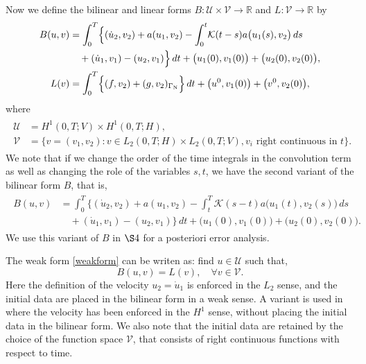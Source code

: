 \documentclass{amsart}
\numberwithin{equation}{section}
\theoremstyle{definition}
\begin{document}
Now we define the bilinear and linear forms
$B:{\mathcal U}\times {\mathcal V} \to \mathbb{R}$ and 
$L:{\mathcal V} \to \mathbb{R}$  
by
\begin{align}  \label{BL}
  \begin{aligned}
    B(u,v)
    &=\int_0^T\!
      \Big\{(\dot u_2,v_2)+a(u_1,v_2)
        -\int_0^t\!{\mathcal K}(t-s)a\big(u_1(s),v_2\big)\,ds\\
    &\quad +(\dot u_1,v_1)-(u_2,v_1)\Big\}\,dt
      +\big(u_1(0),v_1(0)\big)+\big(u_2(0),v_2(0)\big),\\
    L(v)&=\int_0^T\!\Big\{(f,v_2)+(g,v_2)_{\Gamma_{\text N}}\Big\}\,dt
      +\big(u^0,v_1(0)\big)+\big(v^0,v_2(0)\big),
  \end{aligned}
\end{align}
where
\begin{align}   \label{UV}
  \begin{aligned}
    {\mathcal U}&=H^1(0,T;V)\times H^1(0,T;H),\\
    {\mathcal V}&=\big\{v=(v_1,v_2):
      v\in L_2(0,T;H)\times L_2(0,T;V),
      v_i \text{ right continuous in }t \big\}.
  \end{aligned}
\end{align}
We note that if we change the order of the time integrals in the 
convolution term as well as changing the role of the variables $s,t$, 
we have the second variant of the bilinear form $B$, that is, 
\begin{align}  \label{B2}
  \begin{aligned}
    B(u,v)
    &=\int_0^T\!
      \Big\{(\dot u_2,v_2)+a(u_1,v_2)
        -\int_t^T\!{\mathcal K}(s-t) a\big(u_1(t),v_2(s)\big)\,ds \\
    &\quad +(\dot u_1,v_1)-(u_2,v_1) \Big\}\,dt
      +\big(u_1(0),v_1(0)\big)+\big(u_2(0),v_2(0)\big).
  \end{aligned}
\end{align}
We use this variant of $B$ in $\S4$ for a posteriori error analysis.

The weak form \eqref{weakform} can be writen as: 
find $u\in {\mathcal U}$ such that,
\begin{equation} \label{weakformprimary}
  B(u,v)=L(v),\quad \forall v\in{\mathcal V}.
\end{equation}
Here the definition of the velocity $u_2=\dot u_1$ is enforced in the
$L_2$ sense, and the initial data are placed in the bilinear form in
a weak sense. A variant is used in \cite{StigFardin} where the
velocity has been enforced in the $H^1$ sense, without placing the initial data in the bilinear form. 
We also note that the initial data  are retained by the choice of 
the function space ${\mathcal V}$, that
consists of right continuous functions with respect to time.
\end{document}
